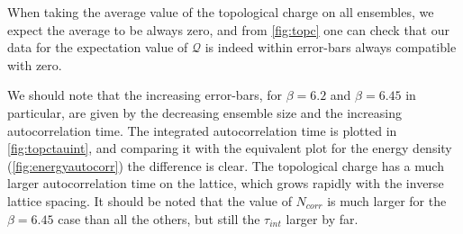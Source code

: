 When taking the average value of the topological charge on all ensembles, we expect the average to be always zero, and from \cref{fig:topc} one can check that our data for the expectation value of $\mathcal{Q}$ is indeed within error-bars always compatible with zero. 

We should note that the increasing error-bars, for $\beta = 6.2$ and $\beta = 6.45$ in particular, are given by the decreasing ensemble size and the increasing autocorrelation time. The integrated autocorrelation time is plotted in \cref{fig:topctauint}, and comparing it with the equivalent plot for the energy density (\cref{fig:energyautocorr}) the difference is clear. The topological charge has a much larger autocorrelation time on the lattice, which grows rapidly with the inverse lattice spacing. It should be noted that the value of $N_{corr}$ is much larger for the $\beta=6.45$ case than all the others, but still the $\tau_{int}$ larger by far.

